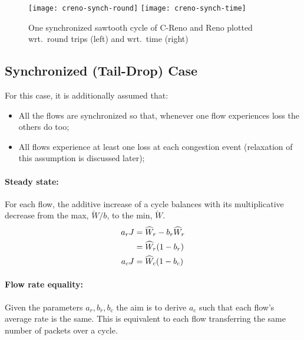 \begin{figure*}
	\centering
	\texttt{[image: creno-synch-round]}
	\texttt{[image: creno-synch-time]}
	\caption{One synchronized sawtooth cycle of C-Reno and Reno plotted wrt.\ round trips (left) and wrt.\ time (right)}\label{fig:creno-synch}
\end{figure*}

\subsection{Synchronized (Tail-Drop) Case}\label{Synch}

For this case, it is additionally assumed that:
\begin{itemize}[nosep]
	\item All the flows are synchronized so that, whenever one flow experiences loss the others do too;

	\item All flows experience at least one loss at each congestion event (relaxation of this assumption is discussed later);
\end{itemize}

\paragraph{Steady state:} For each flow, the additive increase of a cycle balances with its multiplicative decrease from the max, \(\check{W}/b\), to the min, \(\check{W}\). 
\begin{align}
	a_r J &= \widehat{W}_r - b_r\widehat{W}_r\notag\\
	      &= \widehat{W}_r(1-b_r)\label{eqn:ssr}\\
	a_c J &= \widehat{W}_c(1-b_c)\label{eqn:ssc}
\end{align}

\paragraph{Flow rate equality:} Given the parameters \(a_r, b_r, b_c\) the aim is to derive \(a_c\) such that each flow's average rate is the same. This is equivalent to each flow transferring the same number of packets over a cycle. 

